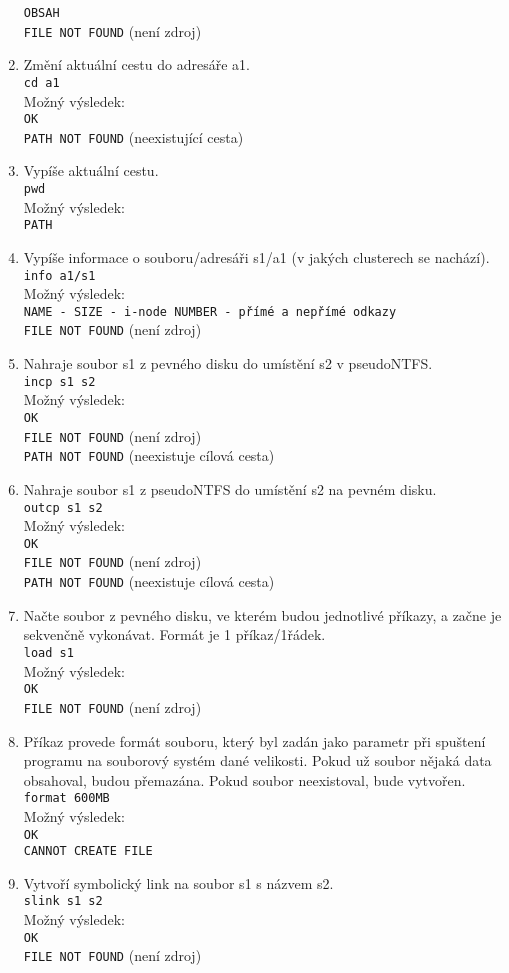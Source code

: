 \documentclass[12pt]{scrartcl}
\begin{document}
\begin{enumerate}
\texttt{OBSAH}\\
\texttt{FILE NOT FOUND} (není zdroj)
\item Změní aktuální cestu do adresáře a1.\\
\texttt{cd a1}\\
Možný výsledek:\\
\texttt{OK}\\
\texttt{PATH NOT FOUND} (neexistující cesta)
\item Vypíše aktuální cestu.\\
\texttt{pwd}\\
Možný výsledek:\\
\texttt{PATH}
\item Vypíše informace o souboru/adresáři s1/a1 (v jakých clusterech se nachází).\\
\texttt{info a1/s1}\\
Možný výsledek:\\
\texttt{NAME - SIZE - i-node NUMBER - přímé a nepřímé odkazy}\\
\texttt{FILE NOT FOUND} (není zdroj)
\item Nahraje soubor s1 z pevného disku do umístění s2 v pseudoNTFS.\\
\texttt{incp s1 s2}\\
Možný výsledek:\\
\texttt{OK}\\
\texttt{FILE NOT FOUND} (není zdroj)\\
\texttt{PATH NOT FOUND} (neexistuje cílová cesta)
\item Nahraje soubor s1 z pseudoNTFS do umístění s2 na pevném disku.\\
\texttt{outcp s1 s2}\\
Možný výsledek:\\
\texttt{OK}\\
\texttt{FILE NOT FOUND} (není zdroj)\\
\texttt{PATH NOT FOUND} (neexistuje cílová cesta)\\
\item Načte soubor z pevného disku, ve kterém budou jednotlivé příkazy, a začne je sekvenčně
vykonávat. Formát je 1 příkaz/1řádek.\\
\texttt{load s1}\\
Možný výsledek:\\
\texttt{OK}\\
\texttt{FILE NOT FOUND} (není zdroj)
\item Příkaz provede formát souboru, který byl zadán jako parametr při spuštení programu na
souborový systém dané velikosti. Pokud už soubor nějaká data obsahoval, budou přemazána.
Pokud soubor neexistoval, bude vytvořen.
\texttt{format 600MB}\\
Možný výsledek:\\
\texttt{OK}\\
\texttt{CANNOT CREATE FILE}
\item Vytvoří symbolický link na soubor s1 s názvem s2.\\
\texttt{slink s1 s2}\\
Možný výsledek:\\
\texttt{OK}\\
\texttt{FILE NOT FOUND} (není zdroj)
\end{enumerate}
\end{document}
